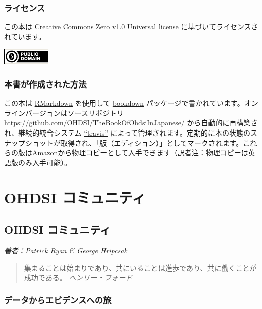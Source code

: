 \documentclass[
  11pt]{book}
\theoremstyle{definition}
\theoremstyle{definition}
\theoremstyle{definition}
\theoremstyle{definition}
\theoremstyle{remark}
\begin{document}
\section*{ライセンス}\label{ux30e9ux30a4ux30bbux30f3ux30b9}

この本は \href{http://creativecommons.org/publicdomain/zero/1.0/}{Creative Commons Zero v1.0 Universal license} に基づいてライセンスされています。

\includegraphics{images/Preface/cc0.png}

\section*{本書が作成された方法}\label{ux672cux66f8ux304cux4f5cux6210ux3055ux308cux305fux65b9ux6cd5}

この本は \href{https://rmarkdown.rstudio.com}{RMarkdown} を使用して \href{https://bookdown.org}{bookdown} パッケージで書かれています。オンラインバージョンはソースリポジトリ \url{https://github.com/OHDSI/TheBookOfOhdsiInJapanese/} から自動的に再構築され、継続的統合システム \href{http://travis-ci.org/}{``travis''} によって管理されます。定期的に本の状態のスナップショットが取得され、「版（エディション）」としてマークされます。これらの版はAmazonから物理コピーとして入手できます（訳者注：物理コピーは英語版のみ入手可能）。

\mainmatter

\part{OHDSI コミュニティ}\label{part-ohdsi-ux30b3ux30dfux30e5ux30cbux30c6ux30a3}

\chapter{OHDSI コミュニティ}\label{OhdsiCommunity}

\emph{著者：Patrick Ryan \& George Hripcsak}

\begin{quote}
集まることは始まりであり、共にいることは進歩であり、共に働くことが成功である。 \emph{ヘンリー・フォード}
\end{quote}

\section{データからエビデンスへの旅}\label{ux30c7ux30fcux30bfux304bux3089ux30a8ux30d3ux30c7ux30f3ux30b9ux3078ux306eux65c5}
\end{document}
